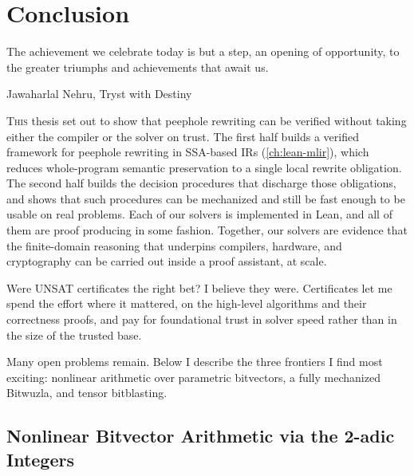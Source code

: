\chapter{Conclusion}
\label{ch:future-work}
\epigraph{The achievement we celebrate today is but a step, an opening of opportunity, to the greater triumphs and achievements that await us.}{Jawaharlal Nehru, Tryst with Destiny}

\lettrine{T}{his} thesis set out to show that peephole rewriting can be verified
without taking either the compiler or the solver on trust.
The first half builds a verified framework for peephole rewriting in SSA-based IRs (\cref{ch:lean-mlir}),
which reduces whole-program semantic preservation to a single local rewrite obligation.
The second half builds the decision procedures that discharge those obligations,
and shows that such procedures can be mechanized and still be fast enough to be usable on real problems.
Each of our solvers is implemented in Lean, and all of them are proof producing in some fashion.
Together, our solvers are evidence that the finite-domain reasoning that underpins compilers,
hardware, and cryptography can be carried out inside a proof assistant, at scale.

Were UNSAT certificates the right bet? I believe they were.
Certificates let me spend the effort where it mattered, on the high-level algorithms and their
correctness proofs, and pay for foundational trust in solver speed rather than in the size of the trusted base.

Many open problems remain. Below I describe the three frontiers I find most exciting:
nonlinear arithmetic over parametric bitvectors, a fully mechanized Bitwuzla, and tensor bitblasting.

\section{Nonlinear Bitvector Arithmetic via the 2-adic Integers}

